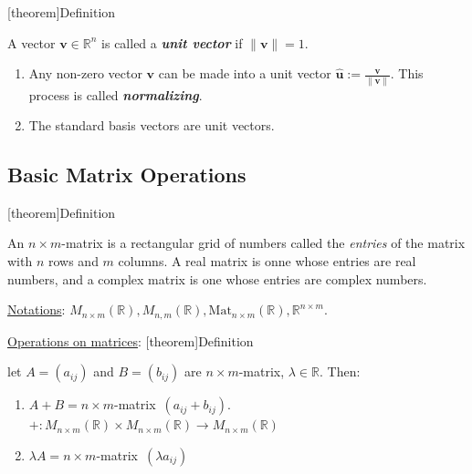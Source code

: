 \documentclass[12pt]{report}
\theoremstyle{definition}
\begin{document}
[theorem]{Definition}
\begin{unit vector}
    A vector $\mathbf{v} \in \mathbb{R}^{n}$ is called a \textbf{\emph{unit vector}}
    if $\lVert\mathbf{v}\rVert = 1$.
\end{unit vector}

\smallskip
\begin{ex}
    \;

    \begin{enumerate}[label = (\arabic*)]
        \item Any non-zero vector $\mathbf{v}$ can be made into a unit vector
            $\hat{\mathbf{u}} := \frac{\mathbf{v}}{\lVert\mathbf{v}\rVert}$. This process is called \textbf{\emph{normalizing}}.
        \item The standard basis vectors are unit vectors.
    \end{enumerate}
    
\end{ex}

\subsection{Basic Matrix Operations}

[theorem]{Definition}
\begin{matrix definition}
    An $n \times m$-matrix is a rectangular grid of numbers called the \emph{entries} of the matrix
    with $n$ rows and $m$ columns. A real matrix is onne whose entries are real numbers,
    and a complex matrix is one whose entries are complex numbers.

    \underline{Notations}: $M_{n \times m}(\mathbb{R}), M_{n,m}(\mathbb{R}), \mbox{Mat}_{n\times m}(\mathbb{R}), \mathbb{R}^{n\times m}$.

\end{matrix definition}

\underline{Operations on matrices}:
[theorem]{Definition}
\begin{matrices operation}
    let $A = (a_{ij})$ and $B = (b_{ij})$ are $n\times m$-matrix, $\lambda \in \mathbb{R}$. Then:
    \begin{enumerate}[label = (\arabic*)]
        \item $A+B = n\times m$-matrix $\,(a_{ij} + b_{ij})$.
            $+: M_{n \times m}(\mathbb{R}) \times M_{n \times m}(\mathbb{R}) \rightarrow M_{n \times m}(\mathbb{R})$
        \item $\lambda A = n \times m$-matrix $\,(\lambda a_{ij})$
    \end{enumerate}
    
\end{matrices operation}
\end{document}

